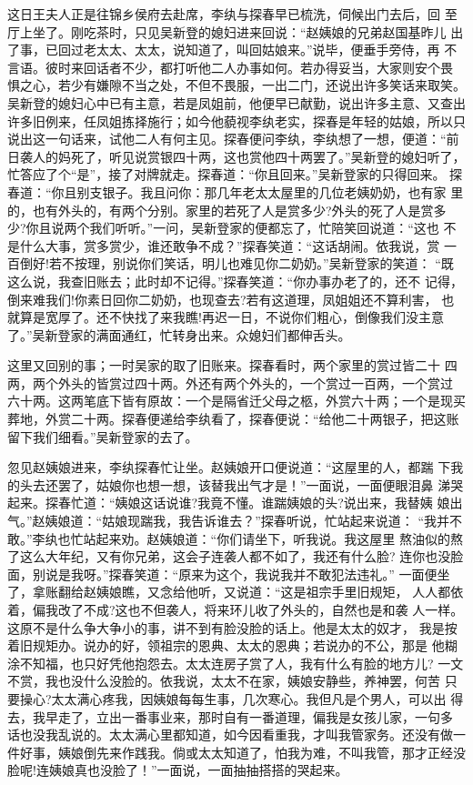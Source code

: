 这日王夫人正是往锦乡侯府去赴席，李纨与探春早已梳洗，伺候出门去后，回
至厅上坐了。刚吃茶时，只见吴新登的媳妇进来回说：“赵姨娘的兄弟赵国基昨儿
出了事，已回过老太太、太太，说知道了，叫回姑娘来。”说毕，便垂手旁侍，再
不言语。彼时来回话者不少，都打听他二人办事如何。若办得妥当，大家则安个畏
惧之心，若少有嫌隙不当之处，不但不畏服，一出二门，还说出许多笑话来取笑。
吴新登的媳妇心中已有主意，若是凤姐前，他便早已献勤，说出许多主意、又查出
许多旧例来，任凤姐拣择施行；如今他藐视李纨老实，探春是年轻的姑娘，所以只
说出这一句话来，试他二人有何主见。探春便问李纨，李纨想了一想，便道：“前
日袭人的妈死了，听见说赏银四十两，这也赏他四十两罢了。”吴新登的媳妇听了，
忙答应了个“是”，接了对牌就走。探春道：“你且回来。”吴新登家的只得回来。
探春道：“你且别支银子。我且问你：那几年老太太屋里的几位老姨奶奶，也有家
里的，也有外头的，有两个分别。家里的若死了人是赏多少?外头的死了人是赏多
少?你且说两个我们听听。”一问，吴新登家的便都忘了，忙陪笑回说道：“这也
不是什么大事，赏多赏少，谁还敢争不成？”探春笑道：“这话胡闹。依我说，赏
一百倒好!若不按理，别说你们笑话，明儿也难见你二奶奶。”吴新登家的笑道：
“既这么说，我查旧账去；此时却不记得。”探春笑道：“你办事办老了的，还不
记得，倒来难我们!你素日回你二奶奶，也现查去?若有这道理，凤姐姐还不算利害，
也就算是宽厚了。还不快找了来我瞧!再迟一日，不说你们粗心，倒像我们没主意
了。”吴新登家的满面通红，忙转身出来。众媳妇们都伸舌头。

这里又回别的事；一时吴家的取了旧账来。探春看时，两个家里的赏过皆二十
四两，两个外头的皆赏过四十两。外还有两个外头的，一个赏过一百两，一个赏过
六十两。这两笔底下皆有原故：一个是隔省迁父母之柩，外赏六十两；一个是现买
葬地，外赏二十两。探春便递给李纨看了，探春便说：“给他二十两银子，把这账
留下我们细看。”吴新登家的去了。

忽见赵姨娘进来，李纨探春忙让坐。赵姨娘开口便说道：“这屋里的人，都踹
下我的头去还罢了，姑娘你也想一想，该替我出气才是！”一面说，一面便眼泪鼻
涕哭起来。探春忙道：“姨娘这话说谁?我竟不懂。谁踹姨娘的头?说出来，我替姨
娘出气。”赵姨娘道：“姑娘现踹我，我告诉谁去？”探春听说，忙站起来说道：
“我并不敢。”李纨也忙站起来劝。赵姨娘道：“你们请坐下，听我说。我这屋里
熬油似的熬了这么大年纪，又有你兄弟，这会子连袭人都不如了，我还有什么脸?
连你也没脸面，别说是我呀。”探春笑道：“原来为这个，我说我并不敢犯法违礼。”
一面便坐了，拿账翻给赵姨娘瞧，又念给他听，又说道：“这是祖宗手里旧规矩，
人人都依着，偏我改了不成?这也不但袭人，将来环儿收了外头的，自然也是和袭
人一样。这原不是什么争大争小的事，讲不到有脸没脸的话上。他是太太的奴才，
我是按着旧规矩办。说办的好，领祖宗的恩典、太太的恩典；若说办的不公，那是
他糊涂不知福，也只好凭他抱怨去。太太连房子赏了人，我有什么有脸的地方儿?
一文不赏，我也没什么没脸的。依我说，太太不在家，姨娘安静些，养神罢，何苦
只要操心?太太满心疼我，因姨娘每每生事，几次寒心。我但凡是个男人，可以出
得去，我早走了，立出一番事业来，那时自有一番道理，偏我是女孩儿家，一句多
话也没我乱说的。太太满心里都知道，如今因看重我，才叫我管家务。还没有做一
件好事，姨娘倒先来作践我。倘或太太知道了，怕我为难，不叫我管，那才正经没
脸呢!连姨娘真也没脸了！”一面说，一面抽抽搭搭的哭起来。


